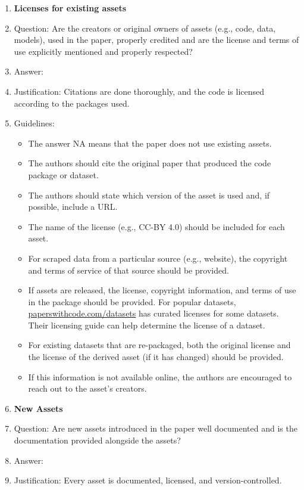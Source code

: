 \documentclass{article}
\begin{document}
\begin{enumerate}
\item {\bf Licenses for existing assets}
    \item[] Question: Are the creators or original owners of assets (e.g., code, data, models), used in the paper, properly credited and are the license and terms of use explicitly mentioned and properly respected?
    \item[] Answer: \answerYes{} %
    \item[] Justification: Citations are done thoroughly, and the code is licensed according to the packages used.
      
    \item[] Guidelines:
    \begin{itemize}
        \item The answer NA means that the paper does not use existing assets.
        \item The authors should cite the original paper that produced the code package or dataset.
        \item The authors should state which version of the asset is used and, if possible, include a URL.
        \item The name of the license (e.g., CC-BY 4.0) should be included for each asset.
        \item For scraped data from a particular source (e.g., website), the copyright and terms of service of that source should be provided.
        \item If assets are released, the license, copyright information, and terms of use in the package should be provided. For popular datasets, \url{paperswithcode.com/datasets} has curated licenses for some datasets. Their licensing guide can help determine the license of a dataset.
        \item For existing datasets that are re-packaged, both the original license and the license of the derived asset (if it has changed) should be provided.
        \item If this information is not available online, the authors are encouraged to reach out to the asset's creators.
    \end{itemize}

\item {\bf New Assets}
    \item[] Question: Are new assets introduced in the paper well documented and is the documentation provided alongside the assets?
    \item[] Answer: \answerYes{} %
    \item[] Justification: Every asset is documented, licensed, and version-controlled.
     

\end{enumerate}
\end{document}
